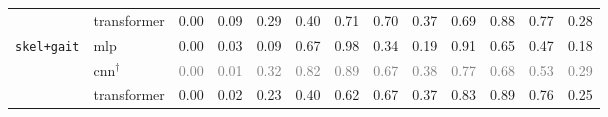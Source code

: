 \begin{table}[t]
{\begin{tabular}{llccccccccccc}
 & transformer & 0.00 & 0.09 & 0.29 & 0.40 & 0.71 & 0.70 & 0.37 & 0.69 & 0.88 & 0.77 & 0.28 \\
\addlinespace
\texttt{skel+gait} & mlp & 0.00 & 0.03 & 0.09 & 0.67 & 0.98 & 0.34 & 0.19 & 0.91 & 0.65 & 0.47 & 0.18 \\
 & cnn$^\dagger$ & \textcolor{gray}{0.00} & \textcolor{gray}{0.01} & \textcolor{gray}{0.32} & \textcolor{gray}{0.82} & \textcolor{gray}{0.89} & \textcolor{gray}{0.67} & \textcolor{gray}{0.38} & \textcolor{gray}{0.77} & \textcolor{gray}{0.68} & \textcolor{gray}{0.53} & \textcolor{gray}{0.29} \\
 & transformer & 0.00 & 0.02 & 0.23 & 0.40 & 0.62 & 0.67 & 0.37 & 0.83 & 0.89 & 0.76 & 0.25 \\
\bottomrule
\end{tabular}}
\end{table}
